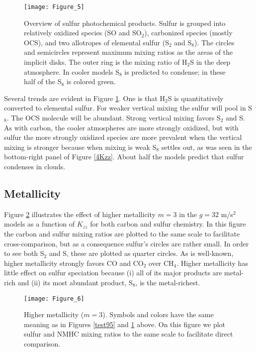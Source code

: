\documentclass[preprint]{aastex}
\begin{document}
 \begin{figure}[!htb] 
   \centering
   \texttt{[image: Figure\_5]} 
   \caption{\small Overview of sulfur photochemical products. 
   Sulfur is grouped into relatively oxidized species (SO and SO$_2$), 
   carbonized species (mostly OCS), and two allotropes of elemental sulfur (S$_2$ and S$_8$).
   The circles and semicircles represent maximum mixing ratios as the areas of the implicit disks. 
   The outer ring is the mixing ratio of H$_2$S in the deep atmosphere.
   In cooler models S$_8$ is predicted to condense; in these half of the S$_8$ is colored green.
 }
\label{test85}
\end{figure}

   Several trends are evident in Figure \ref{test85}. 
   One is that H$_2$S is quantitatively converted to elemental sulfur.
  For weaker vertical mixing the sulfur will pool in S$_8$. 
   The OCS molecule will be abundant.
  Strong vertical mixing favors S$_2$ and S.
   As with carbon, the cooler atmospheres are more strongly oxidized, but with sulfur
   the more strongly oxidized species are more prevalent when the vertical mixing is stronger
   because when mixing is weak S$_8$ settles out, as was seen in the bottom-right panel of Figure \ref{4Kzz}.
   About half the models predict that sulfur condenses in clouds. 


\subsection{Metallicity}

Figure \ref{test93} illustrates the effect of higher metallicity $m=3$ in the $g=32$ m/s$^2$ models
as a function of $K_{zz}$ for both carbon and sulfur chemistry.
In this figure the carbon and sulfur mixing ratios are plotted to the same scale to facilitate cross-comparison,
but as a consequence sulfur's circles are rather small.
In order to see both S$_2$ and S, these are plotted as quarter circles.
   As is well-known, higher metallicity strongly favors CO and CO$_2$ over CH$_4$.  
   Higher metallicity has little effect on sulfur speciation because
   (i) all of its major products are metal-rich and (ii) its most abundant product, S$_8$, is the metal-richest.
   
 \begin{figure}[!htb] 
   \centering
   \texttt{[image: Figure\_6]} 
   \caption{\small Higher metallicity ($m=3$). 
   Symbols and colors have the same meaning as in Figures \ref{test95} and \ref{test85} above.
   On this figure we plot sulfur and NMHC mixing ratios to the same scale to facilitate direct comparison.
}
\label{test93}
\end{figure}
\end{document}
